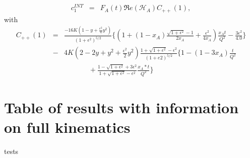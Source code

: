 \documentclass[aps,prc,preprint,superscriptaddress]{revtex4}
\begin{document}
\begin{eqnarray}
   c_1^{INT} &=&  F_A(t) \Re e(\mathcal{H}_{A}) C_{++}(1),
\end{eqnarray}
with  
   \begin{eqnarray}
   C_{++}(1) &=&
   \frac{-16K(1-y+\frac{\epsilon^{2}}{4}y^2)}{(1+\epsilon^{2})^{5/2}}\bigg\{\left(1+(1-x_A)\frac{\sqrt{1+\epsilon^{2}}-1}{2x_A} 
   + \frac{\epsilon^{2}}{4x_A}\right) 
\frac{x_At}{Q^2}-\frac{3\epsilon^{2}}{4.0} \bigg\} \nonumber \\&-& 4K \left( 
2-2y+y^2+\frac{\epsilon^{2}}{2}y^2\right)\frac{1+\sqrt{1+\epsilon^{2}}-\epsilon^{2}}{(1+e2)^{5/2}}\bigg\{1-(1-3x_A)\frac{t}{Q^2}\nonumber\\&\,\,\,\,&\,\,\,\,\,\,\,\,\,\,\,\,\,\,\,\,\,\,\,\,\,+\frac{1-\sqrt{1+\epsilon^{2}}+3\epsilon^{2}}{1+\sqrt{1+\epsilon^{2}}-\epsilon^{2}} 
\frac{x_A*t}{Q^2}\bigg\} \label{eq:c1I}
\end{eqnarray}


\section{Table of results with information on full kinematics}
\label{sec:fullresults}
 tests


\end{document}
